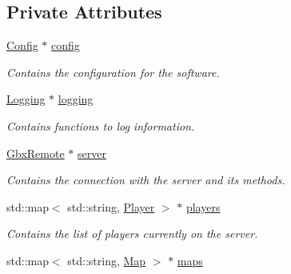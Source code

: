 \subsection*{Private Attributes}
\begin{DoxyCompactItemize}
\item 
\hypertarget{classManiaPP_a9a91437fa70afd52c2dce19298888e36}{\hyperlink{classConfig}{Config} $\ast$ \hyperlink{classManiaPP_a9a91437fa70afd52c2dce19298888e36}{config}}\label{classManiaPP_a9a91437fa70afd52c2dce19298888e36}

\begin{DoxyCompactList}\small\item\em Contains the configuration for the software. \end{DoxyCompactList}\item 
\hypertarget{classManiaPP_aa4cea090301bdf0bf652ad377e7b01c0}{\hyperlink{classLogging}{Logging} $\ast$ \hyperlink{classManiaPP_aa4cea090301bdf0bf652ad377e7b01c0}{logging}}\label{classManiaPP_aa4cea090301bdf0bf652ad377e7b01c0}

\begin{DoxyCompactList}\small\item\em Contains functions to log information. \end{DoxyCompactList}\item 
\hypertarget{classManiaPP_ab81311d6901990cb99a7a30e0cbaab11}{\hyperlink{classGbxRemote}{Gbx\-Remote} $\ast$ \hyperlink{classManiaPP_ab81311d6901990cb99a7a30e0cbaab11}{server}}\label{classManiaPP_ab81311d6901990cb99a7a30e0cbaab11}

\begin{DoxyCompactList}\small\item\em Contains the connection with the server and its methods. \end{DoxyCompactList}\item 
\hypertarget{classManiaPP_a45712ccfa91b20242b39cb1164d305d8}{std\-::map$<$ std\-::string, \hyperlink{structPlayer}{Player} $>$ $\ast$ \hyperlink{classManiaPP_a45712ccfa91b20242b39cb1164d305d8}{players}}\label{classManiaPP_a45712ccfa91b20242b39cb1164d305d8}

\begin{DoxyCompactList}\small\item\em Contains the list of players currently on the server. \end{DoxyCompactList}\item 
\hypertarget{classManiaPP_a903ccf13c65b15c99595cb571214799d}{std\-::map$<$ std\-::string, \hyperlink{structMap}{Map} $>$ $\ast$ \hyperlink{classManiaPP_a903ccf13c65b15c99595cb571214799d}{maps}}\label{classManiaPP_a903ccf13c65b15c99595cb571214799d}


\end{DoxyCompactItemize}
